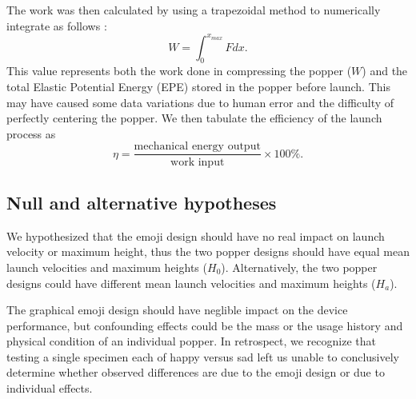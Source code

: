 \documentclass[reprint,amsmath,amssymb,aps,twoside]{revtex4-2} %
\begin{document}

The work was then calculated by using a trapezoidal method to numerically integrate as follows \cite{tipler,calculus}:
\begin{equation}
W = \int_0^{x_{max}} F dx.
\end{equation}
This value represents both the work done in compressing the popper ($W$) and the total Elastic Potential Energy (EPE) stored in the popper before launch. This may have caused some data variations due to human error and the difficulty of perfectly centering the popper.  We then tabulate the efficiency of the launch process as 
\begin{equation}
\eta = \dfrac{\text{mechanical energy output}}{\text{work input}} \times 100\%.
\end{equation}
    
\subsection{Null and alternative hypotheses}
We hypothesized that the emoji design should have no real impact on launch velocity or maximum height, thus the two popper designs should have equal mean launch velocities and maximum heights ($H_0$). Alternatively, the two popper designs could have different mean launch velocities and maximum heights ($H_a$). 

The graphical emoji design should have neglible impact on the device performance, but confounding effects could be the mass or the usage history and physical condition of an individual popper. In retrospect, we recognize that testing a single specimen each of happy versus sad left us unable to conclusively determine whether observed differences are due to the emoji design or due to individual effects. 
\end{document}
